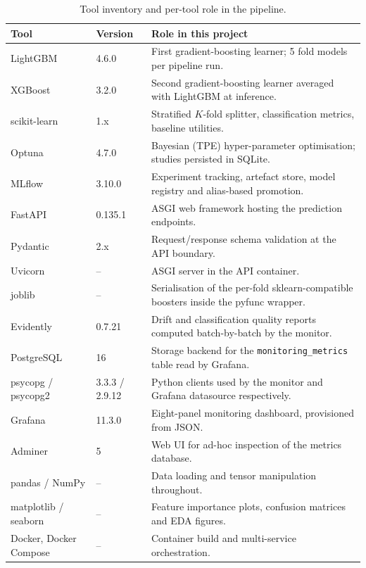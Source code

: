 \documentclass[conference,a4paper,10pt]{IEEEtran}
\begin{document}
\begin{table}[t]
\caption{Tool inventory and per-tool role in the pipeline.}
\label{tab:tools}
\centering\small
\begin{tabularx}{\textwidth}{@{}llX@{}}
\toprule
\textbf{Tool} & \textbf{Version} & \textbf{Role in this project} \\
\midrule
LightGBM       & 4.6.0   & First gradient-boosting learner; 5 fold models per pipeline run. \\
XGBoost        & 3.2.0   & Second gradient-boosting learner averaged with LightGBM at inference. \\
scikit-learn   & 1.x     & Stratified $K$-fold splitter, classification metrics, baseline utilities. \\
Optuna         & 4.7.0   & Bayesian (TPE) hyper-parameter optimisation; studies persisted in SQLite. \\
MLflow         & 3.10.0  & Experiment tracking, artefact store, model registry and alias-based promotion. \\
FastAPI        & 0.135.1 & ASGI web framework hosting the prediction endpoints. \\
Pydantic       & 2.x     & Request/response schema validation at the API boundary. \\
Uvicorn        & --      & ASGI server in the API container. \\
joblib         & --      & Serialisation of the per-fold sklearn-compatible boosters inside the pyfunc wrapper. \\
Evidently      & 0.7.21  & Drift and classification quality reports computed batch-by-batch by the monitor. \\
PostgreSQL     & 16      & Storage backend for the \texttt{monitoring\_metrics} table read by Grafana. \\
psycopg / psycopg2 & 3.3.3 / 2.9.12 & Python clients used by the monitor and Grafana datasource respectively. \\
Grafana        & 11.3.0  & Eight-panel monitoring dashboard, provisioned from JSON. \\
Adminer        & 5       & Web UI for ad-hoc inspection of the metrics database. \\
pandas / NumPy & --      & Data loading and tensor manipulation throughout. \\
matplotlib / seaborn & -- & Feature importance plots, confusion matrices and EDA figures. \\
Docker, Docker Compose & --     & Container build and multi-service orchestration. \\

\end{tabularx}
\end{table}
\end{document}
